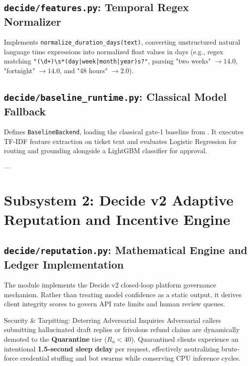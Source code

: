 \documentclass[11pt,a4paper]{article}
\begin{document}
\subsection{\texttt{decide/features.py}: Temporal Regex Normalizer}
Implements \texttt{normalize\_duration\_days(text)}, converting unstructured natural language time expressions into normalized float values in days (e.g., regex matching \texttt{"(\textbackslash d+)\textbackslash s*(day|week|month|year)s?"}, parsing "two weeks" $\to 14.0$, "fortnight" $\to 14.0$, and "48 hours" $\to 2.0$).

\subsection{\texttt{decide/baseline\_runtime.py}: Classical Model Fallback}
Defines \texttt{BaselineBackend}, loading the classical gate-1 baseline from . It executes TF-IDF feature extraction on ticket text and evaluates Logistic Regression for routing and grounding alongside a LightGBM classifier for approval.

---

\section{Subsystem 2: Decide v2 Adaptive Reputation and Incentive Engine}

\subsection{\texttt{decide/reputation.py}: Mathematical Engine and Ledger Implementation}
The  module implements the Decide v2 closed-loop platform governance mechanism. Rather than treating model confidence as a static output, it derives client integrity scores to govern API rate limits and human review queues.

\begin{warnbox}{Security \& Tarpitting: Deterring Adversarial Inquiries}
Adversarial callers submitting hallucinated draft replies or frivolous refund claims are dynamically demoted to the \textbf{Quarantine} tier ($R_u < 40$). Quarantined clients experience an intentional \textbf{1.5-second sleep delay} per request, effectively neutralizing brute-force credential stuffing and bot swarms while conserving CPU inference cycles.
\end{warnbox}
\end{document}
